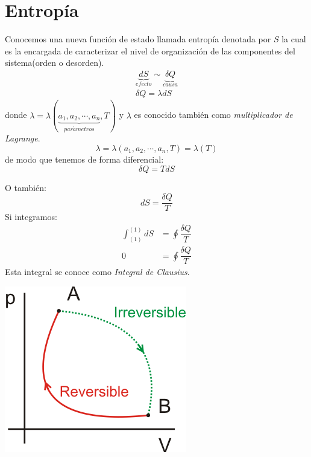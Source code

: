 \documentclass[../main]{subfiles}
\begin{document}
\section{Entropía}
    Conocemos una nueva función de estado llamada entropía denotada por $S$ la cual es la encargada de caracterizar el nivel de organización de las componentes del sistema(orden o desorden).
\begin{align}
    \underbrace{dS}_{efecto}\sim \underbrace{\delta Q}_{causa} \\
    \delta Q= \lambda dS
\end{align}
donde $\lambda=\lambda(\underbrace{a_1,a_2, \cdots, a_n}_{par\acute{a}metros}, T)$ y $\lambda$ es conocido también como \textit{multiplicador de Lagrange}.
\begin{equation}
    \lambda = \lambda(a_1,a_2,\cdots, a_n,T)=\lambda(T)
\end{equation}
de modo que tenemos de forma diferencial:
\begin{equation}
    \delta Q=TdS
\end{equation}
\begin{minipage}{0.5\textwidth}
    O también:
    \begin{equation}
        dS= \dfrac{\delta Q}{T}
    \end{equation}
    Si integramos:
    \begin{align}
        \int_{(1)}^{(1)}dS&=\oint \dfrac{\delta Q}{T} \\
        0&= \oint \dfrac{\delta Q}{T}
    \end{align}
    Esta integral se conoce como \textit{Integral de Clausius}.
\end{minipage}
\begin{minipage}{0.5\textwidth}
    \begin{center}
     \includegraphics[scale=0.6]{Termodinámica/images/ciclo_irrev.png}       
    \end{center}
\end{minipage}
\end{document}
